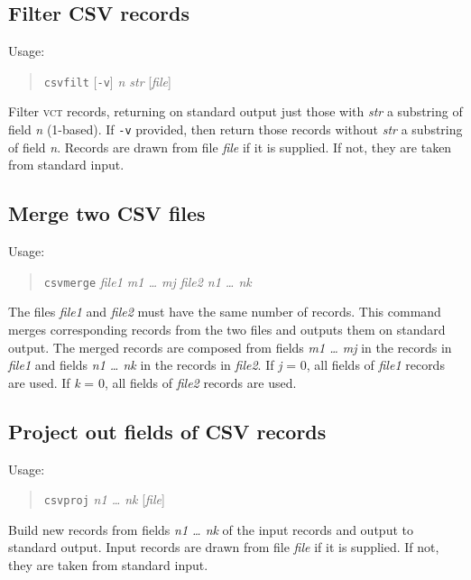 \documentclass[12pt,fleqn]{article}
\newcommand{\csv}{\textsc{vct}}
\begin{document}
\subsection{Filter CSV records}
Usage:
\begin{quote}
   \texttt{csvfilt} [\texttt{-v}] \textit{n str} [\textit{file}]
\end{quote}
Filter \csv{} records, returning on standard output just those with
\textit{str} a substring of field \textit{n} (1-based).
%
If \texttt{-v} provided, then return those records without
\textit{str} a substring of field \textit{n}.
Records are drawn from file \textit{file} if it is supplied. If not, they
are taken from standard input.

\subsection{Merge two CSV files}
Usage:
\begin{quote}
   \texttt{csvmerge} \textit{file1 m1 \ldots{} mj file2 n1 \ldots{} nk}
\end{quote}
The files \textit{file1} and \textit{file2} must have the same number
of records.
This command merges corresponding records from the two files and outputs
them on standard output.
The merged records are composed from 
fields \textit{m1 \ldots{} mj} in the records in \textit{file1} and 
fields \textit{n1 \ldots{} nk} in the records in \textit{file2}.
If \textit{j} = 0, all fields of  \textit{file1} records are used.
If \textit{k} = 0, all fields of  \textit{file2} records are used.


\subsection{Project out fields of CSV records}
Usage:
\begin{quote}
  \texttt{csvproj} \textit{n1 \ldots{} nk} [\textit{file}]
\end{quote}
Build new records from fields \textit{n1 \ldots{} nk} of the input
records and output to standard output.  Input records are drawn from
file \textit{file} if it is supplied. If not, they are taken from
standard input.
\end{document}
